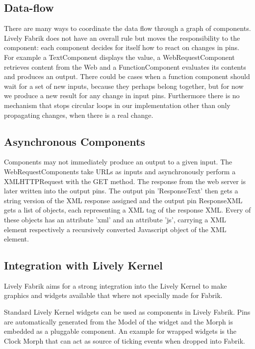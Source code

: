 \documentclass[pdftex, times, 10pt, twocolumn]{article}
\begin{document}
\subsection{Data-flow}
There are many ways to coordinate the data flow through a graph of components. Lively Fabrik does not have an overall rule but moves the responsibility to the component: each component decides for itself how to react on changes in pins. For example a TextComponent displays the value, a WebRequestComponent retrieves content from the Web and a FunctionComponent evaluates its contents and produces an output. There could be cases when a function component should wait for a set of new inputs, because they perhaps belong together, but for now we produce a new result for any change in input pins. Furthermore there is no mechanism that stops circular loops in our implementation other than only propagating changes, when there is a real change.  



\subsection{Asynchronous Components}
Components may not immediately produce an output to a given input. The WebRequestComponents take URLs as inputs and asynchronously perform a XMLHTTPRequest with the GET method. The response from the web server is later written into the output pins. The output pin 'ResponseText' then gets a string version of the XML response assigned and the output pin ResponseXML gets a list of objects, each representing a XML tag of the response XML. Every of these objects has an attribute 'xml' and an attribute 'js', carrying a XML element respectively a recursively converted Javascript object of the XML element. 



\subsection{Integration with Lively Kernel}
Lively Fabrik aims for a strong integration into the Lively Kernel to make graphics and widgets available that where not specially made for Fabrik.  

Standard Lively Kernel widgets can be used as components in Lively Fabrik. Pins are automatically generated from the Model of the widget and the Morph is embedded as a pluggable component. An example for wrapped widgets is the Clock Morph that can act as source of ticking events when dropped into Fabrik.  
\end{document}
